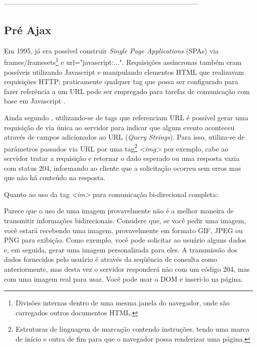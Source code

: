 ------------------------------------------------------------------------------------
\subsection{Pré Ajax}

Em 1995, já era possível construir \emph{Single Page Applications} (SPAs) via frames/framesets\footnote{Divisões internas dentro de uma mesma janela do navegador, onde são carregados outros documentos HTML.} e url="javascript:...". Requisições assíncronas também eram possíveis utilizando Javascript e manipulando elementos HTML que realizavam requisições HTTP; praticamente qualquer tag que possa ser configurado para fazer referência a um URL pode ser empregado para tarefas de comunicação com base em Javascript \cite{powell2008ajax}.

Ainda segundo , utilizando-se de tags que referenciam URL é possível gerar uma requisição de via única ao servidor para indicar que algum evento aconteceu através de campos adicionados ao URL (\emph{Query Strings}). Para isso, utiliza-se de parâmetros passados via URL por uma tag\footnote{Estruturas de linguagem de marcação contendo instruções, tendo uma marca de início e outra de fim para que o navegador possa renderizar uma página.} \emph{<img>} por exemplo, cabe ao servidor tratar a requisição e retornar o dado esperado ou uma resposta vazia com status 204, informando ao cliente que a solicitação ocorreu sem erros mas que não há conteúdo na resposta.

Quanto ao uso da tag \emph{<im>} para comunicação bi-direcional  completa:

\begin{citacao}
	Parece que o uso de uma imagem provavelmente não é a melhor maneira de transmitir informações bidirecionais. Considere que, se você pedir uma imagem, você estará recebendo uma imagem, provavelmente em formato GIF, JPEG ou PNG para exibição. Como exemplo, você pode solicitar ao usuário alguns dados e, em seguida, gerar uma imagem personalizada para eles. A transmissão dos dados fornecidos pelo usuário é através da seqüência de consulta como anteriormente, mas desta vez o servidor responderá não com um código 204, mas com uma imagem real para usar. Você pode usar o DOM e inseri-lo na página.
\end{citacao}

